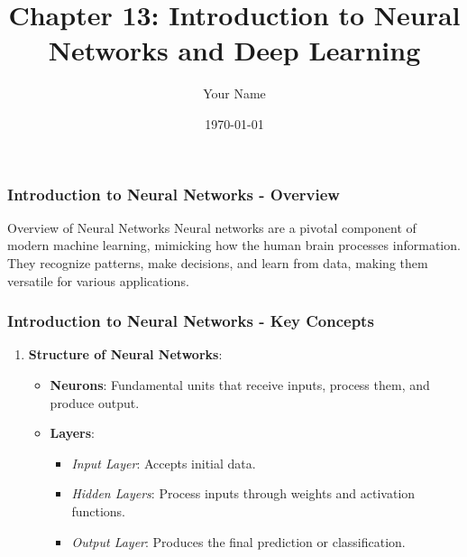 \documentclass[aspectratio=169]{beamer}
\title[Chapter 13]{Chapter 13: Introduction to Neural Networks and Deep Learning}
\author[Your Name]{Your Name}
\institute[Your Institution]{Your Department, Your Institution}
\date{\today}
\begin{document}
\frame{\titlepage}

\begin{frame}[fragile]
    \titlepage
\end{frame}

\begin{frame}[fragile]
    \frametitle{Introduction to Neural Networks - Overview}
    \begin{block}{Overview of Neural Networks}
        Neural networks are a pivotal component of modern machine learning, mimicking how the human brain processes information. They recognize patterns, make decisions, and learn from data, making them versatile for various applications.
    \end{block}
\end{frame}

\begin{frame}[fragile]
    \frametitle{Introduction to Neural Networks - Key Concepts}
    \begin{enumerate}
        \item \textbf{Structure of Neural Networks}:
        \begin{itemize}
            \item \textbf{Neurons}: Fundamental units that receive inputs, process them, and produce output.
            \item \textbf{Layers}:
            \begin{itemize}
                \item \textit{Input Layer}: Accepts initial data.
                \item \textit{Hidden Layers}: Process inputs through weights and activation functions.
                \item \textit{Output Layer}: Produces the final prediction or classification.
            \end{itemize}
        \end{itemize}
    \end{enumerate}
\end{frame}
\end{document}
